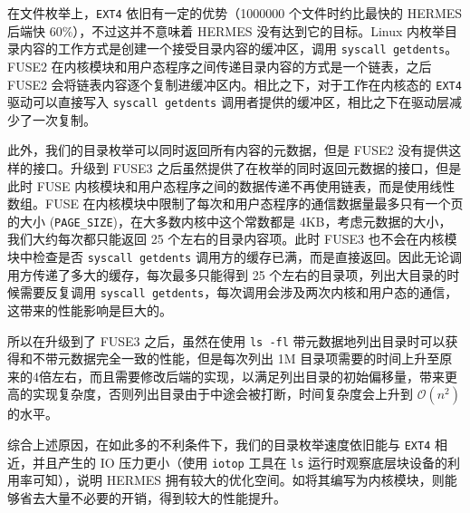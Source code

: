 \documentclass{ctexart}
\begin{document}

在文件枚举上，\texttt{EXT4} 依旧有一定的优势（1000000 个文件时约比最快的 HERMES 后端快 $60\%$），不过这并不意味着 HERMES 没有达到它的目标。Linux 内枚举目录内容的工作方式是创建一个接受目录内容的缓冲区，调用 \texttt{syscall getdents}。FUSE2 在内核模块和用户态程序之间传递目录内容的方式是一个链表，之后 FUSE2 会将链表内容逐个复制进缓冲区内。相比之下，对于工作在内核态的 \texttt{EXT4} 驱动可以直接写入 \texttt{syscall getdents} 调用者提供的缓冲区，相比之下在驱动层减少了一次复制。 

此外，我们的目录枚举可以同时返回所有内容的元数据，但是 FUSE2 没有提供这样的接口。升级到 FUSE3 之后虽然提供了在枚举的同时返回元数据的接口，但是此时 FUSE 内核模块和用户态程序之间的数据传递不再使用链表，而是使用线性数组。FUSE 在内核模块中限制了每次和用户态程序的通信数据量最多只有一个页的大小 (\texttt{PAGE\_SIZE})，在大多数内核中这个常数都是 4KB，考虑元数据的大小，我们大约每次都只能返回 25 个左右的目录内容项。此时 FUSE3 也不会在内核模块中检查是否 \texttt{syscall getdents} 调用方的缓存已满，而是直接返回。因此无论调用方传递了多大的缓存，每次最多只能得到 25 个左右的目录项，列出大目录的时候需要反复调用 \texttt{syscall getdents}，每次调用会涉及两次内核和用户态的通信，这带来的性能影响是巨大的。

所以在升级到了 FUSE3 之后，虽然在使用 \texttt{ls -fl} 带元数据地列出目录时可以获得和不带元数据完全一致的性能，但是每次列出 1M 目录项需要的时间上升至原来的4倍左右，而且需要修改后端的实现，以满足列出目录的初始偏移量，带来更高的实现复杂度，否则列出目录由于中途会被打断，时间复杂度会上升到 $\mathcal{O}(n^2)$ 的水平。

综合上述原因，在如此多的不利条件下，我们的目录枚举速度依旧能与 \texttt{EXT4} 相近，并且产生的 IO 压力更小（使用 \texttt{iotop} 工具在 \texttt{ls} 运行时观察底层块设备的利用率可知），说明 HERMES 拥有较大的优化空间。如将其编写为内核模块，则能够省去大量不必要的开销，得到较大的性能提升。
\end{document}
